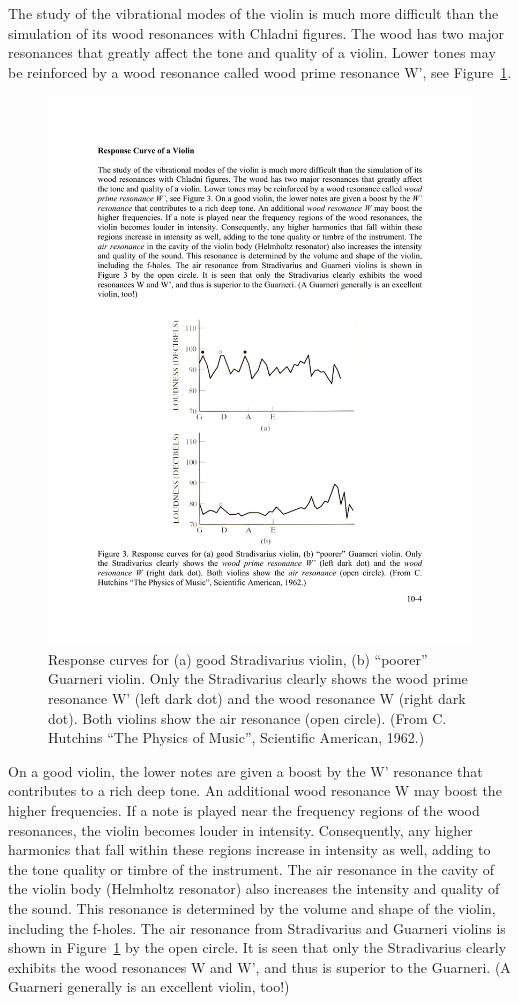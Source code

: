 \documentclass[11pt]{NSF}
\begin{document}
The study of the vibrational modes of the violin is much more
difficult than the simulation of its wood resonances with Chladni
figures. The wood has two major resonances that greatly affect the
tone and quality of a violin. Lower tones may be reinforced by a wood
resonance called wood prime resonance W’, see Figure~\ref{f:3}. 
%
\begin{figure}[hbtp]
\begin{center}
\includegraphics[width=.6\textwidth]{fig10_3}
\caption{Response curves for (a) good Stradivarius violin, (b)
“poorer” Guarneri violin. Only the Stradivarius clearly shows the wood
prime resonance W’ (left dark dot) and the wood resonance W (right
dark dot). Both violins show the air resonance (open circle). (From C.
Hutchins “The Physics of Music”, Scientific American, 1962.)}
\label{f:3}
\end{center}
\end{figure}
%
On a good
violin, the lower notes are given a boost by the W’ resonance that
contributes to a rich deep tone. An additional wood resonance W may
boost the higher frequencies. If a note is played near the frequency
regions of the wood resonances, the violin becomes louder in
intensity. Consequently, any higher harmonics that fall within these
regions increase in intensity as well, adding to the tone quality or
timbre of the instrument. The air resonance in the cavity of the
violin body (Helmholtz resonator) also increases the intensity and
quality of the sound. This resonance is determined by the volume and
shape of the violin, including the f-holes. The air resonance from
Stradivarius and Guarneri violins is shown in Figure~\ref{f:3} by the open
circle. It is seen that only the Stradivarius clearly exhibits the
wood resonances W and W’, and thus is superior to the Guarneri. (A
Guarneri generally is an excellent violin, too!)
\end{document}
